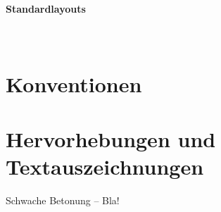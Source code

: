 \documentclass[
ngerman,
paper=a4,
asymmetric,
fontsize=10pt,
draft=false,
numbers=noenddot,
bibtotocnumbered,
footnotes=multiple,
toc=flat,
]{scrbook}
\begin{document}
% 
% 
% 
% 
% 
% 

\paragraph{Standardlayouts}~







\section{Konventionen}



\section{Hervorhebungen und Textauszeichnungen}







\Text
{Schwache Betonung -- }
{Bla!}
{}
{}
{}
{}
\end{document}
